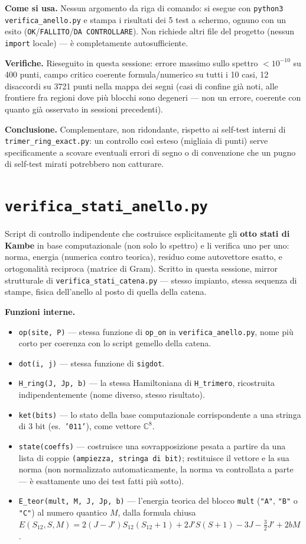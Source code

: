 \documentclass[11pt,a4paper]{article}
\begin{document}
\textbf{Come si usa.} Nessun argomento da riga di comando: si esegue con
\texttt{python3 verifica\_anello.py} e stampa i risultati dei 5 test a schermo, ognuno
con un esito (\texttt{OK}/\texttt{FALLITO}/\texttt{DA CONTROLLARE}). Non richiede
altri file del progetto (nessun \texttt{import} locale) — è completamente
autosufficiente.

\textbf{Verifiche.} Rieseguito in questa sessione: errore massimo sullo spettro
$<10^{-10}$ su 400 punti, campo critico coerente formula/numerico su tutti i 10 casi,
12 disaccordi su 3721 punti nella mappa dei segni (casi di confine già noti, alle
frontiere fra regioni dove più blocchi sono degeneri — non un errore, coerente con
quanto già osservato in sessioni precedenti).

\textbf{Conclusione.} Complementare, non ridondante, rispetto ai self-test interni di
\texttt{trimer\_ring\_exact.py}: un controllo così esteso (migliaia di punti) serve
specificamente a scovare eventuali errori di segno o di convenzione che un pugno di
self-test mirati potrebbero non catturare.

\section*{\texttt{verifica\_stati\_anello.py}}

Script di controllo indipendente che costruisce esplicitamente gli \textbf{otto stati
di Kambe} in base computazionale (non solo lo spettro) e li verifica uno per uno:
norma, energia (numerica contro teorica), residuo come autovettore esatto, e
ortogonalità reciproca (matrice di Gram). Scritto in questa sessione, mirror
strutturale di \texttt{verifica\_stati\_catena.py} — stesso impianto, stessa sequenza
di stampe, fisica dell'anello al posto di quella della catena.

\textbf{Funzioni interne.}
\begin{itemize}
\item \texttt{op(site,\ P)} — stessa funzione di \texttt{op\_on} in
\texttt{verifica\_anello.py}, nome più corto per coerenza con lo script gemello della
catena.
\item \texttt{dot(i,\ j)} — stessa funzione di \texttt{sigdot}.
\item \texttt{H\_ring(J,\ Jp,\ b)} — la stessa Hamiltoniana di
\texttt{H\_trimero}, ricostruita indipendentemente (nome diverso, stesso risultato).
\item \texttt{ket(bits)} — lo stato della base computazionale corrispondente a una
stringa di 3 bit (es.\ \texttt{'011'}), come vettore $\mathbb C^8$.
\item \texttt{state(coeffs)} — costruisce una sovrapposizione pesata a partire da una
lista di coppie \texttt{(ampiezza, stringa di bit)}; restituisce il vettore e la sua
norma (non normalizzato automaticamente, la norma va controllata a parte — è
esattamente uno dei test fatti più sotto).
\item \texttt{E\_teor(mult,\ M,\ J,\ Jp,\ b)} — l'energia teorica del blocco
\texttt{mult} (\texttt{"A"}, \texttt{"B"} o \texttt{"C"}) al numero quantico $M$,
dalla formula chiusa $E(S_{12},S,M)=2(J-J')S_{12}(S_{12}{+}1)+2J'S(S{+}1)-3J-\tfrac32J'+2bM$.
\end{itemize}
\end{document}
